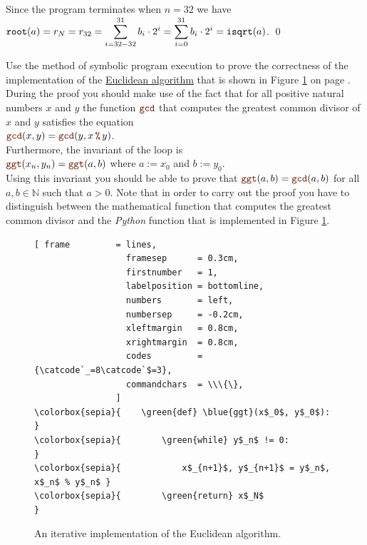 Since the program terminates when $n=32$ we have
\\[0.2cm]
\hspace*{1.3cm}
$\displaystyle \mathtt{root}(a) = r_N = r_{32} = \sum\limits_{i=32-32}^{31} b_i \cdot 2^i = \sum\limits_{i=0}^{31} b_i \cdot 2^i = \mathtt{isqrt}(a)$. \qed
\pagebreak

\exerciseEng
Use the method of symbolic program execution to prove the correctness of the implementation of the
\href{https://en.wikipedia.org/wiki/Euclidean_algorithm}{Euclidean algorithm} that is shown in Figure
\ref{fig:gcd.stlx} on page \pageref{fig:gcd.stlx}.  During the proof 
you should make use of the fact that for all positive natural numbers $x$ and $y$ the function $\mytt{gcd}$
that computes the greatest common divisor of $x$ and $y$ satisfies the equation
\\[0.2cm]
\hspace*{1.3cm}
$\mytt{gcd}(x, y) = \mytt{gcd}(y, x \,\mytt{\%}\, y)$.
\\[0.2cm]
Furthermore, the invariant of the  loop is
\\[0.2cm]
\hspace*{1.3cm}
$\mytt{ggt}(x_n, y_n) = \mytt{ggt}(a, b)$ \quad where $a := x_0$ and $b := y_0$.
\\[0.2cm]
Using this invariant you should be able to prove that $\mytt{ggt}(a, b) = \mytt{gcd}(a, b)$ for all
$a, b \in \mathbb{N}$ such that $a > 0$.  Note that in order to carry out the proof you have to distinguish
between the mathematical function  that computes the greatest common divisor and the \textsl{Python}
function  that is implemented in Figure \ref{fig:gcd.stlx}.
\eox

\begin{figure}[!ht]
\centering
\begin{Verbatim}[ frame         = lines, 
                  framesep      = 0.3cm, 
                  firstnumber   = 1,
                  labelposition = bottomline,
                  numbers       = left,
                  numbersep     = -0.2cm,
                  xleftmargin   = 0.8cm,
                  xrightmargin  = 0.8cm,
                  codes         = {\catcode`_=8\catcode`$=3},
                  commandchars  = \\\{\},
                ]
\colorbox{sepia}{    \green{def} \blue{ggt}(x$_0$, y$_0$):               }
\colorbox{sepia}{        \green{while} y$_n$ != 0:                       }
\colorbox{sepia}{            x$_{n+1}$, y$_{n+1}$ = y$_n$, x$_n$ % y$_n$ }
\colorbox{sepia}{        \green{return} x$_N$                            }
\end{Verbatim}
\vspace*{-0.3cm}
\caption{An iterative implementation of the Euclidean algorithm.}
\label{fig:gcd.stlx}
\end{figure}

